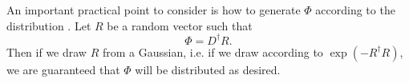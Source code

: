 An important practical point to consider is how to generate $\Phi$ according to
the distribution . Let $R$ be a random
vector such that
\begin{equation}
\Phi=D^\dagger R.
\end{equation}
Then if we draw $R$ from a Gaussian, i.e. if we draw
according to $\exp\left(-R^\dagger R\right)$, we are guaranteed that
$\Phi$ will be distributed as desired.


